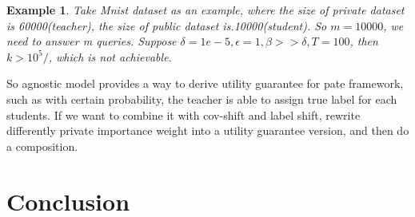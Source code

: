 \documentclass{article}
\newtheorem{example}{Example}
\theoremstyle{definition}
\begin{document}
\begin{example}
Take Mnist dataset as an example, where the size of private dataset is 60000(teacher), the size of public dataset is.10000(student). So $m=10000$, we need to answer m queries. Suppose $\delta = 1e-5, \epsilon = 1, \beta >> \delta, T = 100$, then $ k > 10^5/$, which is not achievable.
\end{example}
So agnostic model provides a way to derive utility guarantee for pate framework, such as with certain probability, the teacher is able to assign true label for each students.  If we want to combine it with cov-shift and label shift, rewrite differently private importance weight into a utility guarantee version, and then do a composition.
\section{Conclusion}



\end{document}
